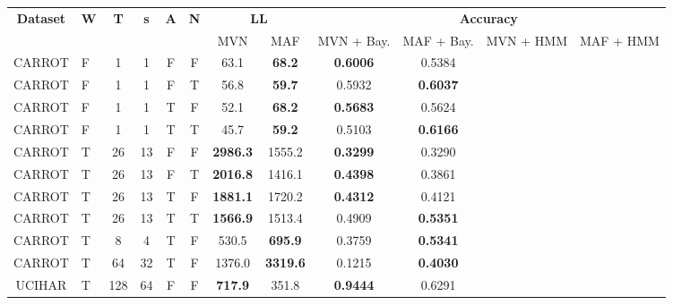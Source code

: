 \documentclass[11pt,titlepage,oneside,openany]{book}
\begin{document}
\begin{table}
	\centering
	\tiny
\begin{tabular}{c l c c c c c c c c c c}
	\toprule
	\multirow{2}{*}{\bfseries Dataset} & 
	\multirow{2}{*}{\bfseries W} & 
	\multirow{2}{*}{\bfseries T} &
	\multirow{2}{*}{\bfseries s} &
	\multirow{2}{*}{\bfseries A} &
	\multirow{2}{*}{\bfseries N} &
	\multicolumn{2}{c}{\bfseries LL} & 
	\multicolumn{4}{c}{\bfseries Accuracy}\\
	\cmidrule(lr){7-8}
	\cmidrule(lr){9-12}
	 & & & & & & MVN & MAF & MVN + Bay. & MAF + Bay. & MVN + HMM & MAF + HMM \\
	\cmidrule(lr){1-12}
	CARROT &   F &       1 &       1 &    F &  F &   63.1 &   \textbf{68.2} &   \textbf{0.6006} &   0.5384 \\
	CARROT &   F &       1 &       1 &    F &   T &   56.8 &   \textbf{59.7} &   0.5932 &   \textbf{0.6037} \\
	CARROT &   F &       1 &       1 &     T &  F &   52.1 &   \textbf{68.2} &  \textbf{0.5683} &   0.5624 \\
	CARROT &   F &       1 &       1 &     T &   T &   45.7 &   \textbf{59.2} &   0.5103 &   \textbf{0.6166} \\
	CARROT &   T &      26 &      13 &    F &  F & \textbf{2986.3} & 1555.2 &   \textbf{0.3299} &   0.3290 \\
	CARROT &   T &      26 &      13 &    F &   T & \textbf{2016.8} & 1416.1 &   \textbf{0.4398} &   0.3861 \\
	CARROT &   T &      26 &      13 &     T &  F & \textbf{1881.1} & 1720.2 &   \textbf{0.4312} &   0.4121 \\
	CARROT &   T &      26 &      13 &     T &   T & \textbf{1566.9} & 1513.4 &   0.4909 &   \textbf{0.5351} \\
	CARROT &   T &       8 &       4 &     T &  F &  530.5 & \textbf{695.9} &   0.3759 &   \textbf{0.5341} \\
	CARROT &   T &      64 &      32 &     T &  F & 1376.0 & \textbf{3319.6} &   0.1215 &   \textbf{0.4030} \\
	UCIHAR &   T &     128 &      64 &    F &  F &  \textbf{717.9} &  351.8 &   \textbf{0.9444} &   0.6291 \\
	\bottomrule
\end{tabular}
\end{table}
\end{document}
